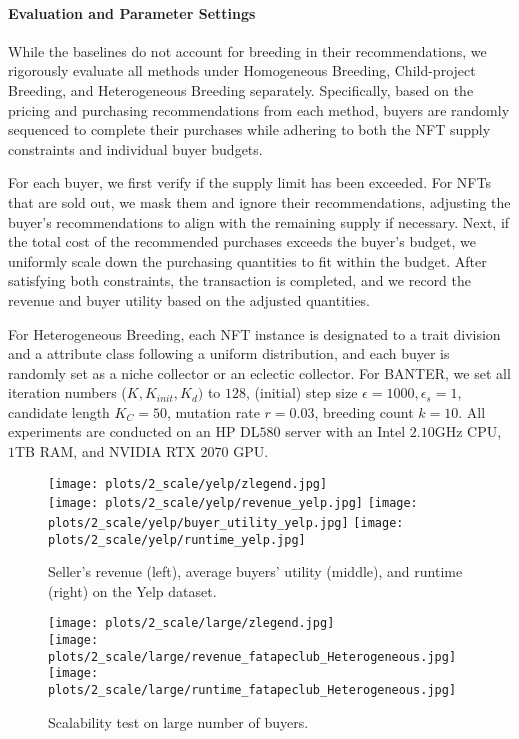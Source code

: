 \documentclass[conference]{IEEEtran}
\newcommand{\1}[1]{\mathds{1}\left[#1\right]}
\theoremstyle{plain}
\newcommand{\method}{\textsf{BANTER}\xspace}
\newcommand{\homob}{Homogeneous Breeding\xspace}
\newcommand{\heterb}{Heterogeneous Breeding\xspace}
\newcommand{\childb}{Child-project Breeding\xspace}
\begin{document}
{\paragraph{Evaluation and Parameter Settings}
While the baselines do not account for breeding in their recommendations, we rigorously evaluate all methods under \homob, \childb, and \heterb separately. Specifically, based on the pricing and purchasing recommendations from each method, buyers are randomly sequenced to complete their purchases while adhering to both the NFT supply constraints and individual buyer budgets.

For each buyer, we first verify if the supply limit has been exceeded. For NFTs that are sold out, we mask them and ignore their recommendations, adjusting the buyer’s recommendations to align with the remaining supply if necessary. Next, if the total cost of the recommended purchases exceeds the buyer’s budget, we uniformly scale down the purchasing quantities to fit within the budget. After satisfying both constraints, the transaction is completed, and we record the revenue and buyer utility based on the adjusted quantities.


For \heterb, each NFT instance is designated to a trait division and a attribute class following a uniform distribution, and each buyer is randomly set as a niche collector or an eclectic collector. For \method, we set all iteration numbers ($K, K_{init}, K_{d})$ to $128$, (initial) step size $\epsilon=1000, \epsilon_s=1$, candidate length $K_C=50$, mutation rate $r=0.03$, breeding count $k=10$. All experiments are conducted on an HP DL$580$ server with an Intel $2.10$GHz CPU, $1$TB RAM, and NVIDIA RTX $2070$ GPU.
}


\begin{figure*}[t!]
    \centering
    \begin{minipage}[t]{.48\textwidth}
    \centering
    \texttt{[image: plots/2\_scale/yelp/zlegend.jpg]}\\
    \texttt{[image: plots/2\_scale/yelp/revenue\_yelp.jpg]}
    \texttt{[image: plots/2\_scale/yelp/buyer\_utility\_yelp.jpg]}
    \texttt{[image: plots/2\_scale/yelp/runtime\_yelp.jpg]}
    \caption{Seller's revenue (left), average buyers' utility (middle), and runtime (right) on the Yelp dataset.}
    \label{fig:yelp-results}
\end{minipage}
    \hfill
    \begin{minipage}[t]{.48\textwidth}
    \centering
    \texttt{[image: plots/2\_scale/large/zlegend.jpg]}\\
    \hfill
    \texttt{[image: plots/2\_scale/large/revenue\_fatapeclub\_Heterogeneous.jpg]}
    \quad
    \texttt{[image: plots/2\_scale/large/runtime\_fatapeclub\_Heterogeneous.jpg]}
    \hfill
    \vspace{-2mm}
    \caption{Scalability test on large number of buyers.}
    \label{fig:scale}
\end{minipage}
    \vspace{-2mm}
\end{figure*}
\end{document}
